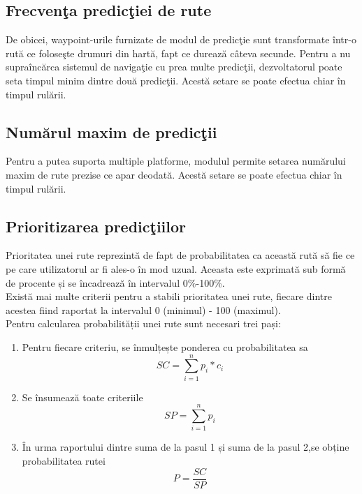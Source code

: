 	
		\subsection{Frecvenţa predicţiei de rute}
		De obicei, waypoint-urile furnizate de modul de predicţie sunt transformate într-o rută ce foloseşte drumuri din hartă, fapt ce durează câteva secunde.
		Pentru a nu supraîncărca sistemul de navigaţie cu prea multe predicţii, dezvoltatorul poate seta timpul minim dintre două predicţii. Acestă setare se poate efectua chiar în timpul rulării.
		
		\subsection{Numărul maxim de predicţii}
		Pentru a putea suporta multiple platforme, modulul permite setarea numărului maxim de rute prezise ce apar deodată. Acestă setare se poate efectua chiar în timpul rulării.
		
		\subsection{Prioritizarea predicţiilor}
		Prioritatea unei rute reprezintă de fapt de probabilitatea ca această rută să fie ce pe care utilizatorul ar fi ales-o în mod uzual. Aceasta este exprimată sub formă de procente și se încadrează în intervalul 0\%-100\%.
		\vspace{6pt}
		\\Există mai multe criterii pentru a stabili prioritatea unei rute, fiecare dintre acestea fiind raportat la intervalul 0 (minimul) - 100 (maximul).  
		\vspace{6pt}
	    \\Pentru calcularea probabilității unei rute sunt necesari trei pași: 
	    
	    \begin{enumerate}
	     \setlength\itemsep{0em}
		 \item Pentru fiecare criteriu, se înmulțește ponderea cu probabilitatea sa 
		 \begin{equation}\label{qoat1}
		  SC = \sum_{i=1}^{n} p_{i}*c_{i}
		 \end{equation}
	     \item Se însumează toate criteriile  
		  \begin{equation}\label{qoat2}	      
	       SP = \sum_{i=1}^{n} p_{i}
	      \end{equation}
	     \item În urma raportului dintre suma de la pasul 1 și suma de la pasul 2,se obține probabilitatea rutei
	    \begin{equation}\label{qoat}	   
	     P = \frac{SC}{SP}
	    \end{equation}
    	\end{enumerate}
    	
